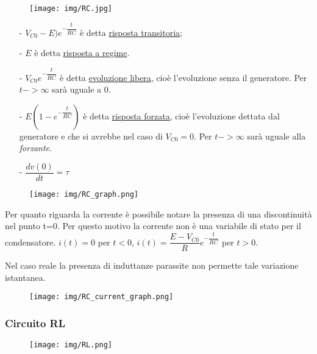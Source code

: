\documentclass{article}
\begin{document}
\begin{figure}[h!]
    \begin{center}
        \texttt{[image: img/RC.jpg]}
    \end{center}
\end{figure}

\begin{itemize}
    \item[-] $V_{C0}-E)e^{-\dfrac{t}{RC}}$ è detta \underline{risposta transitoria};
    \item[-] $E$ è detta \underline{risposta a regime}.
    \item[-] $V_{C0}e^{-\dfrac{t}{RC}}$ è detta \underline{evoluzione libera}, cioè l'evoluzione senza il generatore. Per $t->\infty$ sarà uguale a 0.
    \item[-] $E(1-e^{-\dfrac{t}{RC}})$ è detta \underline{risposta forzata}, cioè l'evoluzione dettata dal generatore e che si avrebbe
    nel caso di $V_{C0}=0$. Per $t->\infty$ sarà uguale alla \textit{forzante}.
    \item[-] $\dfrac{d v(0)}{d t}=\tau$
\end{itemize}


\begin{figure}[h!]
    \begin{center}
        \texttt{[image: img/RC\_graph.png]}
    \end{center}
\end{figure}

\noindent Per quanto riguarda la corrente è possibile notare la presenza di una discontinuità nel punto t=0. Per questo motivo la corrente non è
una variabile di stato per il condensatore. $i(t)=0$ per $t<0$, $i(t)=\dfrac{E-V_{C0}}{R}e^{-\dfrac{t}{RC}}$ per $t>0$.
\pagebreak

\noindent Nel caso reale la presenza di induttanze parassite non permette tale variazione istantanea.
\begin{figure}[h!]
    \begin{center}
        \texttt{[image: img/RC\_current\_graph.png]}
    \end{center}
\end{figure}


\subsubsection{Circuito RL}

\medskip
\noindent{}
\begin{figure}[h!]
    \begin{center}
        \texttt{[image: img/RL.png]}
    \end{center}
\end{figure}
\end{document}
